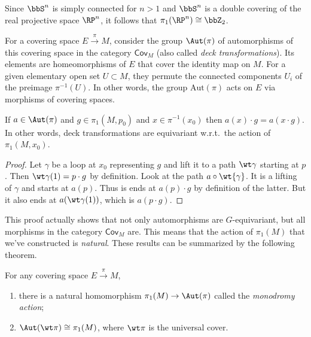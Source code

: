 \begin{example}
    Since $\bbS^n$ is simply connected for $n>1$ and $\bbS^n$ is a double covering of the real projective space $\RP^n$, it follows that $\pi_1(\RP^n)\cong \bbZ_2$.
\end{example}

\begin{defn}
    For a covering space $E\overset{\pi}{\to}{M}$, consider the group $\Aut(\pi)$ of automorphisms of this covering space in the category $\mathsf{Cov}_M$ (also called \emph{deck transformations}). Its elements are homeomorphisms of $E$ that cover the identity map on $M$. For a given elementary open set $U\subset M$, they permute the connected components $U_i$ of the preimage $\pi^{-1}(U)$. In other words, the group $\mathrm{Aut}(\pi)$ acts on $E$ via morphisms of covering spaces.
\end{defn}

\begin{prop}\label{prop 6.2 Bredon}
    If $a\in \Aut(\pi)$ and $g\in\pi_1(M,p_0)$ and $x\in \pi^{-1}(x_0)$ then $a(x)\cdot g=a(x\cdot g)$. In other words, deck transformations are equivariant w.r.t.\ the action of $\pi_1(M,x_0)$.
\end{prop}
\begin{proof}
    Let $\gamma$ be a loop at $x_0$ representing $g$ and lift it to a path $\wt\gamma$ starting at $p$. Then $\wt\gamma(1)=p\cdot g$ by definition. Look at the path $a\circ \wt{\gamma}$. It is a lifting of $\gamma$ and starts at $a(p)$. Thus is ends at $a(p)\cdot g$ by definition of the latter. But it also ends at $a(\wt\gamma(1))$, which is $a(p\cdot g)$.
\end{proof}

This proof actually shows that not only automorphisms are $G$-equivariant, but all morphisms in the category $\mathsf{Cov}_M$ are. This means that the action of $\pi_1(M)$ that we've constructed is \emph{natural}. These results can be summarized by the following theorem.
\begin{thm}
For any covering space $E\overset{\pi}\to M$, 
\begin{enumerate}
    \item there is a natural homomorphism $\pi_1(M)\to \Aut(\pi)$ called the \emph{monodromy action};
    \item $\Aut(\wt \pi)\cong\pi_1(M)$, where $\wt\pi$ is the universal cover.
\end{enumerate}
\end{thm}

